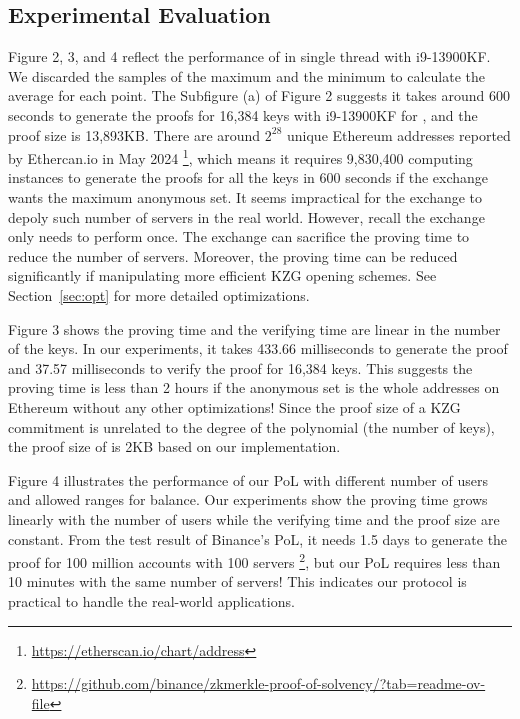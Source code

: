 \subsection{Experimental Evaluation}
Figure 2, 3, and 4 reflect the performance of \Sys in single thread with i9-13900KF. We discarded the samples of the maximum and the minimum to calculate the average for each point. The Subfigure (a) of Figure 2 suggests it takes around 600 seconds to generate the proofs for 16,384 keys with i9-13900KF for \bootstrap, and the proof size is 13,893KB. There are around $2^{28}$ unique Ethereum addresses reported by Ethercan.io in May 2024 \footnote{\url{https://etherscan.io/chart/address}}, which means it requires 9,830,400 computing instances to generate the proofs for all the keys in 600 seconds if the exchange wants the maximum anonymous set. It seems impractical for the exchange to depoly such number of servers in the real world. However, recall the exchange only needs to perform \bootstrap once. The exchange can sacrifice the proving time to reduce the number of servers. Moreover, the proving time can be reduced significantly if manipulating more efficient KZG opening schemes. See Section~\ref{sec:opt} for more detailed optimizations. 

Figure 3 shows the proving time and the verifying time are linear in the number of the keys. In our experiments, it takes 433.66 milliseconds to generate the proof and 37.57 milliseconds to verify the proof for 16,384 keys. This suggests the proving time is less than 2 hours if the anonymous set is the whole addresses on Ethereum without any other optimizations! Since the proof size of a KZG commitment is unrelated to the degree of the polynomial (the number of keys), the proof size of \poa is 2KB based on our implementation.

Figure 4 illustrates the performance of our PoL with different number of users and allowed ranges for balance. Our experiments show the proving time grows linearly with the number of users while the verifying time and the proof size are constant. From the test result of Binance's PoL, it needs 1.5 days to generate the proof for 100 million accounts with 100 servers \footnote{\url{https://github.com/binance/zkmerkle-proof-of-solvency/?tab=readme-ov-file}}, but our PoL requires less than 10 minutes with the same number of servers! This indicates our protocol is practical to handle the real-world applications.

